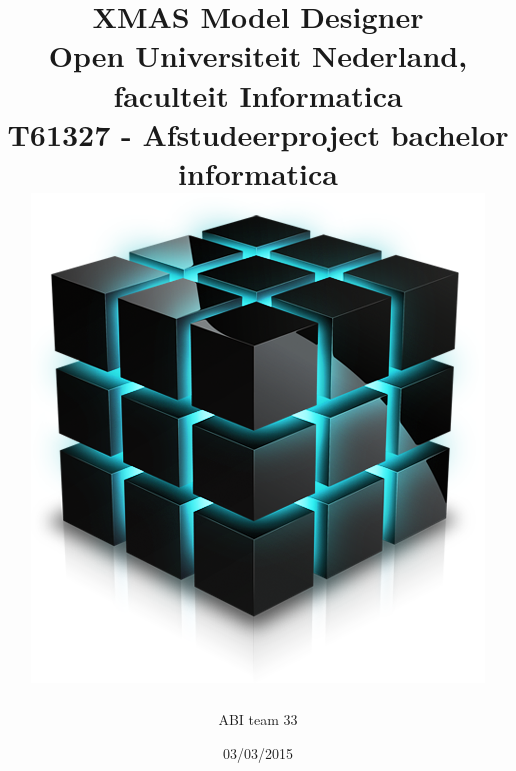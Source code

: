 \documentclass[a4paper,11pt]{report}
\author{ABI team 33}
\date{03/03/2015}
\title{
	{\color{blue}XMAS Model Designer}\\
	{\large Open Universiteit Nederland, faculteit Informatica}\\
	{\small T61327 - Afstudeerproject bachelor informatica}\\
	\vspace{1cm}
	{\includegraphics[width=.25\textwidth]{xmd}}
}
\begin{document}


\nowidow%

\newcommand{\xmas}{x\textsc{mas}}%
\newcommand{\ok}{$\checkmark$}
\newcommand{\w}[1]{\textbf{\textsc{#1}}}
\newcommand\bw[1]{{\color{blue}#1}}
\newcommand{\Noc}{\textsc{NoC}\xspace}%
\newcommand{\cpp}{\textsc{C++}\xspace}%
\newcommand{\mybox}[1]{\begin{boxedminipage}[t]{\textwidth}#1\end{boxedminipage}}




\newcommand\smp[1]{%
	\marginpar{\color{blue}\small\bf\textsc#1}
}%
\newcommand\smpp[1]{\smp{#1}#1}


\maketitle
\end{document}
